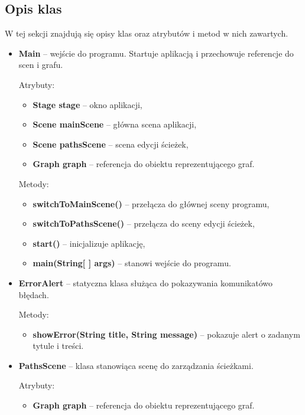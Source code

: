 \documentclass{article}
\begin{document}
\subsection{Opis klas}
W tej sekcji znajdują się opisy klas oraz atrybutów i metod w nich zawartych.
\begin{itemize}
    \item \textbf{Main} -- wejście do programu. Startuje aplikacją i przechowuje referencje do scen i grafu.
    
    Atrybuty:
    \begin{itemize}
        \item \textbf{Stage stage} -- okno aplikacji,
        \item \textbf{Scene mainScene} -- główna scena aplikacji,
        \item \textbf{Scene pathsScene} -- scena edycji ścieżek,
        \item \textbf{Graph graph} -- referencja do obiektu reprezentującego graf.
    \end{itemize}
    
    Metody:
    \begin{itemize}
        \item \textbf{switchToMainScene()} -- przełącza do głównej sceny programu,
        \item \textbf{switchToPathsScene()} -- przełącza do sceny edycji ścieżek,
        \item \textbf{start()} -- inicjalizuje aplikację,
        \item \textbf{main(String[ ] args)} -- stanowi wejście do programu.
    \end{itemize}
    
    \item \textbf{ErrorAlert} -- statyczna klasa służąca do pokazywania komunikatów\linebreak o błędach.
    
    Metody:
    \begin{itemize}
        \item \textbf{showError(String title, String message)} -- pokazuje alert o zadanym tytule i treści.
    \end{itemize}
    
    \item \textbf{PathsScene} -- klasa stanowiąca scenę do zarządzania ścieżkami.
    
    Atrybuty:
    \begin{itemize}
        \item \textbf{Graph graph} -- referencja do obiektu reprezentującego graf.
    \end{itemize}
    

\end{itemize}
\end{document}
